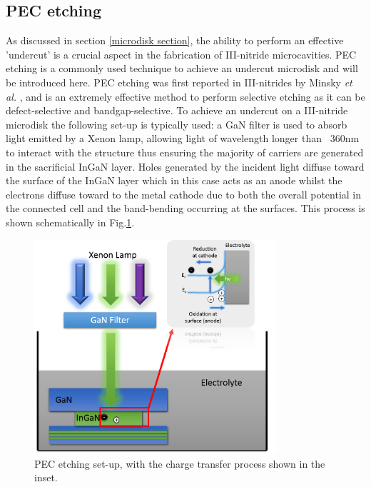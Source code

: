 \subsection{PEC etching}
\label{microdisk fab section}
As discussed in section \ref{microdisk section}, the ability to perform an effective 'undercut' is a crucial aspect in the fabrication of III-nitride microcavities. PEC etching is a commonly used technique to achieve an undercut microdisk and will be introduced here.
PEC etching was first reported in III-nitrides by Minsky \textit{et al.} \cite{Minsky1996}, and is an extremely effective method to perform selective etching as it can be defect-selective and bandgap-selective. To achieve an undercut on a III-nitride microdisk the following set-up is typically used: a GaN filter is used to absorb light emitted by a Xenon lamp, allowing light of wavelength longer than ~360nm to interact with the structure thus ensuring the majority of carriers are generated in the sacrificial InGaN layer. Holes generated by the incident light diffuse toward the surface of the InGaN layer which in this case acts as an anode whilst the electrons diffuse toward to the metal cathode due to both the overall potential in the connected cell and the band-bending occurring at the surfaces. This process is shown schematically in Fig.\ref{PECetch}.

\begin{figure}[h]
	\centering
	\includegraphics[width=0.8\textwidth]{Figs/Ch4/PEC.png}
	\caption {PEC etching set-up, with the charge transfer process shown in the inset.}
	\label{PECetch}
\end{figure}
\FloatBarrier 

